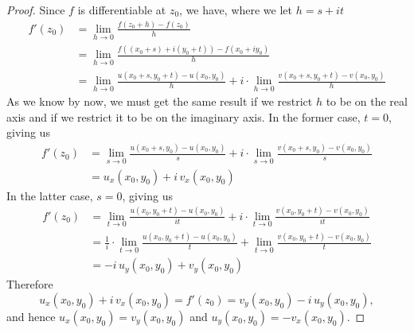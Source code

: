 \begin{proof}
Since $f$ is differentiable at $z_0$, we have, where we let $h = s + it$
\begin{align*}
f'(z_0) &= \lim_{h\to 0}\frac{f(z_0 + h) - f(z_0)}{h}\\[0.5em]
&= \lim_{h\to 0}\frac{f((x_0 + s) + i(y_0 + t)) - f(x_0 + iy_0)}{h}\\[0.5em]
&= \lim_{h\to 0}\frac{u(x_0 + s,y_0 + t) - u(x_0,y_0)}{h} + i\cdot\lim_{h\to 0}\frac{v(x_0 + s,y_0 + t) - v(x_0,y_0)}{h}
\end{align*}
As we know by now, we must get the same result if we restrict $h$ to be on the real axis and if we restrict it to be on the imaginary axis. In the former case, $t = 0$, giving us
\begin{align*}
f'(z_0) &= \lim_{s\to 0}\frac{u(x_0 + s,y_0) - u(x_0,y_0)}{s} + i\cdot\lim_{s\to 0}\frac{v(x_0 + s,y_0) - v(x_0,y_0)}{s}\\[0.5em]
&= u_x(x_0,y_0) + i\,v_x(x_0,y_0)
\end{align*}
In the latter case, $s = 0$, giving us
\begin{align*}
f'(z_0) &= \lim_{t\to 0}\frac{u(x_0,y_0 + t) - u(x_0,y_0)}{it} + i\cdot\lim_{t\to 0}\frac{v(x_0,y_0 + t) - v(x_0,y_0)}{it}\\[0.5em]
&= \frac{1}{i}\cdot\lim_{t\to 0}\frac{u(x_0,y_0 + t) - u(x_0,y_0)}{t} + \lim_{t\to 0}\frac{v(x_0,y_0 + t) - v(x_0,y_0)}{t}\\[0.5em]
&= -i\,u_y(x_0,y_0) + v_y(x_0,y_0)
\end{align*}
Therefore
\[u_x(x_0,y_0) + i\,v_x(x_0,y_0) = f'(z_0) = v_y(x_0,y_0)-i\,u_y(x_0,y_0),\]
and hence $u_x(x_0,y_0) = v_y(x_0,y_0)$ and $u_y(x_0,y_0) = -v_x(x_0,y_0)$.
\end{proof}

\medskip

